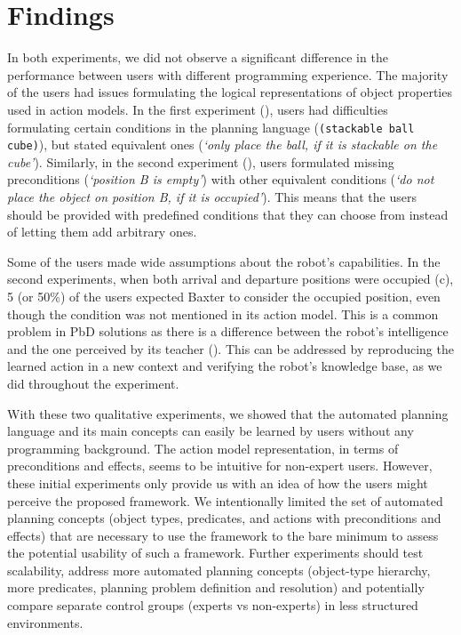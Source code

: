 \section{Findings}
In both experiments, we did not observe a significant difference in the performance between users with different programming experience. 
The majority of the users had issues formulating the logical representations of object properties used in action models. 
In the first experiment (), users had difficulties formulating certain conditions in the planning language (\eg \texttt{(stackable ball cube)}), but stated equivalent ones (\eg \textit{`only place the ball, if it is stackable on the cube'}).
Similarly, in the second experiment (), users formulated missing preconditions (\eg \textit{`position B is empty'}) with other equivalent conditions (\eg \textit{`do not place the object on position B, if it is occupied'}). 
This means that the users should be provided with predefined conditions that they can choose from instead of letting them add arbitrary ones.

Some of the users made wide assumptions about the robot's capabilities. 
In the second experiments, when both arrival and departure positions were occupied (c), 5 (or 50\%) of the users expected Baxter to consider the occupied position, even though the condition was not mentioned in its action model.
This is a common problem in PbD solutions as there is a difference between the robot's intelligence and the one perceived by its teacher (\cite{suay2012practical}).
This can be addressed by reproducing the learned action in a new context and verifying the robot's knowledge base, as we did throughout the experiment.

With these two qualitative experiments, we showed that the automated planning language and its main concepts can easily be learned by users without any programming background. 
The action model representation, in terms of preconditions and effects, seems to be intuitive for non-expert users. 
However, these initial experiments only provide us with an idea of how the users might perceive the proposed framework. 
We intentionally limited the set of automated planning concepts (\ie object types, predicates, and actions with preconditions and effects) that are necessary to use the framework to the bare minimum to assess the potential usability of such a framework. 
Further experiments should test scalability, address more automated planning concepts (\eg object-type hierarchy, more predicates, planning problem definition and resolution) and potentially compare separate control groups (\eg experts vs non-experts) in less structured environments.

